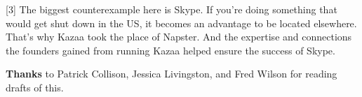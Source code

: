 [3]
The biggest counterexample here is Skype.  If you're doing
something that would get shut down in the US, it becomes an 
advantage to be located elsewhere.  That's why Kazaa took
the place of Napster.  And the expertise and connections the 
founders gained from running Kazaa helped ensure the success
of Skype.

\textbf{Thanks} to Patrick Collison, Jessica Livingston, and Fred Wilson for reading drafts of this.




